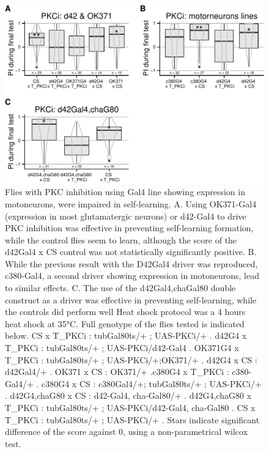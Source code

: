 \documentclass[]{article}
\begin{document}
\begin{figure}[htbp]
\centering
\includegraphics{firsttest_files/figure-latex/unnamed-chunk-4-1.pdf}
\caption{\label{fig:motoneurons} Flies with PKC inhibition using Gal4
line showing expression in motoneurons, were impaired in self-learning.
A. Using OK371-Gal4 (expression in most glutamatergic neurons) or
d42-Gal4 to drive PKC inhibition was effective in preventing
self-learning formation, while the control flies seem to learn, although
the score of the d42Gal4 x CS control was not statistically
significantly positive. B. While the previous result with the D42Gal4
driver was reproduced, c380-Gal4, a second driver showing expression in
motoneurons, lead to similar effects. C. The use of the d42Gal4,chaGal80
double construct as a driver was effective in preventing self-learning,
while the controls did perform well Heat shock protocol was a 4 hours
heat shock at 35°C. Full genotype of the flies tested is indicated
below. CS x T\_PKCi : tubGal80ts/+ ; UAS-PKCi/+ . d42G4 x T\_PKCi :
tubGal80ts/+ ; UAS-PKCi/d42-Gal4 . OK371G4 x T\_PKCi : tubGal80ts/+ ;
UAS-PKCi/+;OK371/+ . d42G4 x CS : d42Gal4/+ . OK371 x CS : OK371/+
.c380G4 x T\_PKCi : c380-Gal4/+ . c380G4 x CS : c380Gal4/+; tubGal80ts/+
; UAS-PKCi/+ . d42G4,chaG80 x CS : d42-Gal4, cha-Gal80/+ . d42G4,chaG80
x T\_PKCi : tubGal80ts/+ ; UAS-PKCi/d42-Gal4, cha-Gal80 . CS x T\_PKCi :
tubGal80ts/+ ; UAS-PKCi/+ . Stars indicate significant difference of the
score against 0, using a non-parametrical wilcox test.}
\end{figure}
\end{document}
